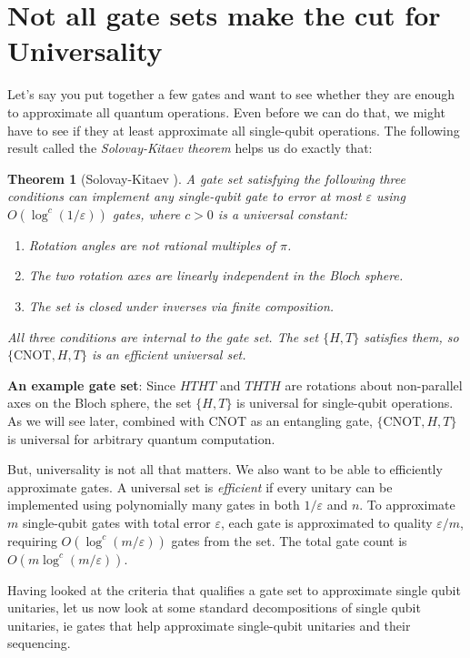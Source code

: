 \documentclass[12pt, a4paper, oneside]{report}
\theoremstyle{plain}
\newtheorem{theorem}{Theorem}[chapter]
\theoremstyle{definition}
\theoremstyle{remark}
\newcommand{\CNOT}{\mathrm{CNOT}}
\begin{document}
\section{Not all gate sets make the cut for Universality}

Let's say you put together a few gates and want to see whether they are enough to approximate all quantum operations. Even before we can do that, we might have to see if they at least approximate all single-qubit operations. The following result called the \emph{Solovay-Kitaev theorem} helps us do exactly that:
\begin{theorem}[Solovay-Kitaev {\cite{solovay-kitaev}}]
	\label{thm:sk}
	A gate set satisfying the following three conditions can implement any single-qubit gate to
	error at most $\varepsilon$ using $O(\log^c(1/\varepsilon))$ gates, where $c > 0$ is a
	universal constant:
	\begin{enumerate}
		\item Rotation angles are not rational multiples of $\pi$.
		\item The two rotation axes are linearly independent in the Bloch sphere.
		\item The set is closed under inverses via finite composition.
	\end{enumerate}
	All three conditions are internal to the gate set. The set $\{H, T\}$ satisfies them, so
	$\{\CNOT, H, T\}$ is an efficient universal set.
\end{theorem}

\textbf{An example gate set}: Since $HTHT$ and $THTH$ are rotations about non-parallel axes on the Bloch sphere, the set
$\{H,T\}$ is universal for single-qubit operations. As we will see later, combined with CNOT as an entangling gate,
$\{\CNOT, H, T\}$ is universal for arbitrary quantum computation.


But, universality is not all that matters. We also want to be able to efficiently approximate gates. A universal set is \emph{efficient} if every unitary can be implemented using polynomially
many gates in both $1/\varepsilon$ and $n$. To approximate $m$ single-qubit gates with total
error $\varepsilon$, each gate is approximated to quality $\varepsilon/m$, requiring
$O(\log^c(m/\varepsilon))$ gates from the set. The total gate count is $O(m\log^c(m/\varepsilon))$.

Having looked at the criteria that qualifies a gate set to approximate single qubit unitaries, let us now look at some standard decompositions of single qubit unitaries, ie gates that help approximate single-qubit unitaries and their sequencing.
\end{document}
